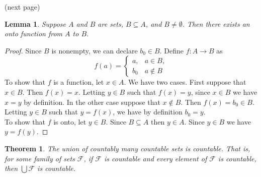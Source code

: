 \documentclass{report}
\newtheorem*{theorem}{Theorem}
\newtheorem*{lemma}{Lemma}
\theoremstyle{definition}
\begin{document}
\noindent(next page)\newpage
\begin{lemma}
Suppose $A$ and $B$ are sets, $B\subseteq A$, and $B\neq\emptyset$. Then there exists an onto function from $A$ to $B$.
\end{lemma}
\begin{proof}
Since $B$ is nonempty, we can declare $b_0\in B$.
Define $f:A\to B$ as
\begin{equation*}
f(a)=\begin{cases}
a,&a\in B,\\
b_0&a\notin B
\end{cases}
\end{equation*}
To show that $f$ is a function, let $x\in A$. We have two cases. First suppose that $x\in B$. Then $f(x)=x$. Letting $y\in B$ such that $f(x)=y$, since $x\in B$ we have $x=y$ by definition. In the
other case suppose that $x\notin B$. Then $f(x)=b_0\in B$. Letting $y\in B$ such that $y=f(x)$, we have by definition $b_0=y$.\\
\indent To show that $f$ is onto, let $y\in B$. Since $B\subseteq A$ then $y\in A$. Since $y\in B$ we have $y=f(y)$.
\end{proof}
\begin{theorem}
The union of countably many countable sets is countable. That is, for some family of sets $\mathcal F$, if $\mathcal F$ is countable and every element of $\mathcal F$ is countable, then 
$\bigcup\mathcal F$ is countable.
\end{theorem}
\end{document}

